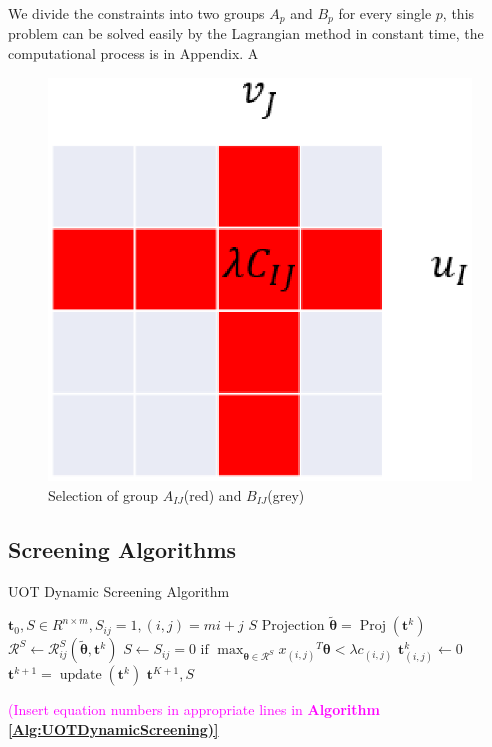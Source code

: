 \documentclass[twoside]{article}
\theoremstyle{plain}
\newcommand{\tranT}{T}
\renewcommand{\vec}[1]{\bm{#1}}
\newcommand{\note}[1]{\textcolor{magenta}{#1}}
\begin{document}
We divide the constraints into two groups $A_p$ and $B_p$ for every single $p$, this problem can be solved easily by the Lagrangian method in constant time, the computational process is in Appendix. A

	\begin{figure}[h]
	\begin{center}	
	\includegraphics[width = 0.7\linewidth]{pic/divide}
	\caption{Selection of group $A_{IJ}$(red) and $B_{IJ}$(grey)}
	\end{center}	
	\end{figure}

\subsection{Screening Algorithms}

 \begin{algorithm}
 \caption{UOT Dynamic Screening Algorithm}
 \begin{algorithmic}[h]
 \label{Alg:UOTDynamicScreening}
 \renewcommand{\algorithmicrequire}{\textbf{Input:}}
 \renewcommand{\algorithmicensure}{\textbf{Output:}}
 \REQUIRE $\vec{t}_0, S \in R^{n\times m}, S_{ij}=1, (i,j) = mi+j$
 \ENSURE $S$
 \STATE {}
 \STATE $\text{Projection } \tilde{\vec{\theta}} = \operatorname{Proj}(\vec{t}^k)$ 
  \STATE $\mathcal{R}^{S} \leftarrow \mathcal{R}_{ij}^S{(\tilde{\vec{\theta}},\vec{t}^k)}$
   \STATE $S \leftarrow {S_{ij} = 0 \text{ if } \max_{\vec{\theta} \in \mathcal{R}^S} {x_{(i,j)}}^{\tranT}\vec{\theta} <\lambda c_{(i,j)} }$
 \ENDFOR
  \ENDFOR
  \STATE $\vec{t}^k_{(i,j)} \leftarrow 0$
  \ENDFOR
  \STATE $\vec{t}^{k+1} = \operatorname{update}(\vec{t}^k)$
 \ENDFOR
   \RETURN $\vec{t}^{K+1}, S $ 
 \end{algorithmic} 
 \end{algorithm}
 \note{(Insert equation numbers in appropriate lines in {\bf Algorithm \ref{Alg:UOTDynamicScreening)}}}
\end{document}
